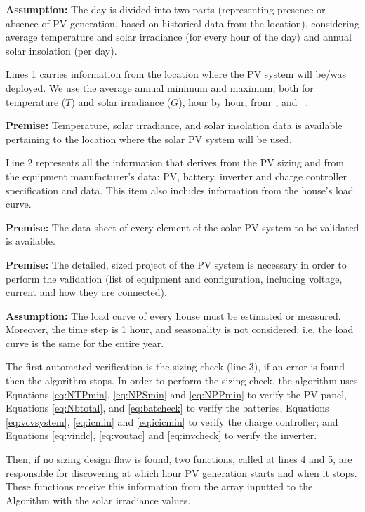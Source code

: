 \textbf{Assumption:} The day is divided into two parts (representing presence or absence of PV generation, based on historical data from the location), considering average temperature and solar irradiance (for every hour of the day) and  annual solar insolation (per day).

Lines 1 carries information from the location where the PV system will be/was deployed. We use the average annual minimum and maximum, both for temperature ($T$) and solar irradiance ($G$), hour by hour, from~\cite{Temperature}, and ~\cite{Irradiance}.

\textbf{Premise:} Temperature, solar irradiance, and solar insolation data is available pertaining to the location where the solar PV system will be used.

Line 2 represents all the information that derives from the PV sizing and from the equipment manufacturer's data: PV, battery, inverter and charge controller specification and data. This item also includes information from the house's load curve.

\textbf{Premise:} The data sheet of every element of the solar PV system to be validated is available.

\textbf{Premise:} The detailed, sized project of the PV system is necessary in order to perform the validation (list of equipment and configuration, including voltage, current and how they are connected).

\textbf{Assumption:} The load curve of every house must be estimated or measured. Moreover, the time step is 1 hour, and seasonality is not considered, i.e. the load curve is the same for the entire year.

The first automated verification is the sizing check (line 3), if an error is found then the algorithm stops. In order to perform the sizing check, the algorithm uses Equations \eqref{eq:NTPmin}, \eqref{eq:NPSmin} and \eqref{eq:NPPmin} to verify the PV panel, Equations \eqref{eq:Nbtotal}, and \eqref{eq:batcheck} to verify the batteries, Equations \eqref{eq:vcvsystem}, \eqref{eq:icmin} and \eqref{eq:icicmin} to verify the charge controller; and Equations \eqref{eq:vindc}, \eqref{eq:voutac} and \eqref{eq:invcheck} to verify the inverter.

Then, if no sizing design flaw is found, two functions, called at lines 4 and 5, are responsible for discovering at which hour PV generation starts and when it stops. These functions receive this information from the array inputted to the Algorithm with the solar irradiance values.

